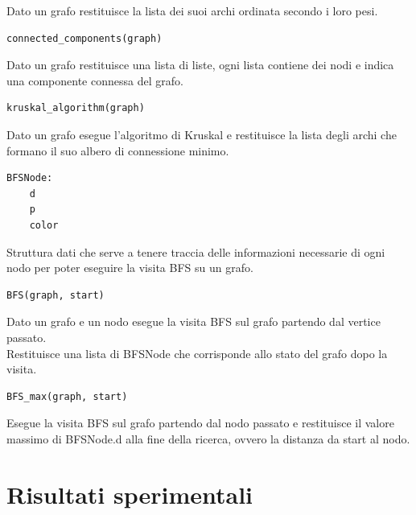 \documentclass[]{article}
\begin{document}
Dato un grafo restituisce la lista dei suoi archi ordinata secondo i loro pesi.\\
\begin{verbatim}
connected_components(graph)
\end{verbatim}
Dato un grafo restituisce una lista di liste, ogni lista contiene dei nodi e indica una componente connessa del grafo.\\
\begin{verbatim}
kruskal_algorithm(graph)
\end{verbatim}
Dato un grafo esegue l'algoritmo di Kruskal e restituisce la lista degli archi che formano il suo albero di connessione minimo.\\
\begin{verbatim}
BFSNode:
	d
	p
	color
\end{verbatim}
Struttura dati che serve a tenere traccia delle informazioni necessarie di ogni nodo per poter eseguire la visita BFS su un grafo.\\
\begin{verbatim}
BFS(graph, start)
\end{verbatim}
Dato un grafo e un nodo esegue la visita BFS sul grafo partendo dal vertice passato.\\
Restituisce una lista di BFSNode che corrisponde allo stato del grafo dopo la visita.\\
\begin{verbatim}
BFS_max(graph, start)
\end{verbatim}
Esegue la visita BFS sul grafo partendo dal nodo passato e restituisce il valore massimo di BFSNode.d alla fine della ricerca, ovvero la distanza da start al nodo.\\
\section{Risultati sperimentali}
\end{document}
